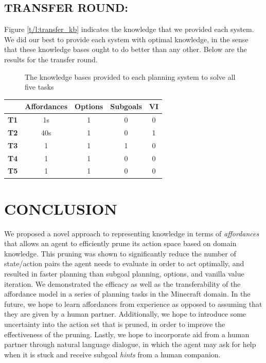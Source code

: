 \documentclass[]{article}
\begin{document}
\subsection{TRANSFER ROUND:}

Figure \ref{t/l:transfer_kb} indicates the knowledge that we provided each system. We did our best to provide each system with optimal knowledge, in the sense that these knowledge bases ought to do better than any other. Below are the results for the transfer round.

\begin{figure}
\centering
{}
\caption{The knowledge bases provided to each planning system to solve all five tasks \label{tbl:transfer_kb}}
\end{figure}

\begin{tabular}{ l || c | c | c | c }
  & Affordances & Options & Subgoals & VI \\
  \hline
  {\bf T1} & 1s & 1 & 0 & 0  \\
  {\bf T2} & 40s & 1 & 0 & 1 \\
  {\bf T3} & 1 & 1 & 1 & 0 \\
  {\bf T4} & 1 & 1 & 0 & 0 \\
  {\bf T5} & 1 & 1 & 0 & 0 \\
\end{tabular}


\section{CONCLUSION}

We proposed a novel approach to representing
knowledge in terms of {\em
  affordances}~\citep{gibson77} that allows an agent to efficiently prune its
action space based on domain knowledge. This pruning was shown to significantly
reduce the number of state/action pairs the agent needs to evaluate
in order to act optimally, and resulted in faster planning than subgoal planning, options,
and vanilla value iteration. We demonstrated the efficacy as well as the 
transferability of the affordance model in a series of planning tasks in the Minecraft domain.
In the future, we hope to learn affordances from experience as opposed to assuming
that they are given by a human partner. Additionally, we hope to introduce some uncertainty
into the action set that is pruned, in order to improve the effectiveness of the pruning. Lastly,
we hope to incorporate aid from a human partner through natural language dialogue, in which
the agent may ask for help when it is stuck and receive subgoal {\it hints} from a human
companion.


  
\end{document}
